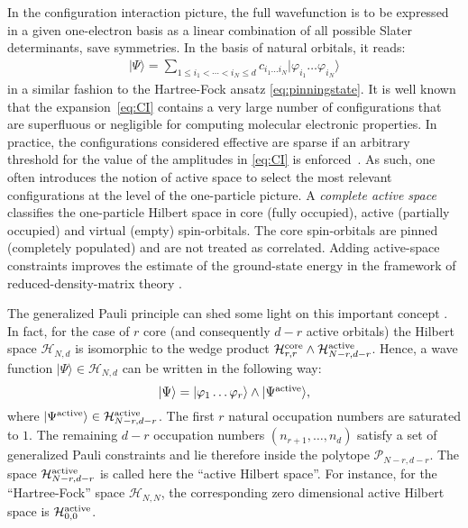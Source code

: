 \documentclass[aps,twocolumn,showpacs,pra,superscriptaddress,floatfix,longbibliography]{revtex4-1}
\newcommand{\7}{\dagger}
\newcommand{\ket}[1]{\mbox{$| #1 \rangle$}}
\renewcommand{\H}{\mathcal{H}}
\begin{document}
 In the configuration interaction picture, the full wavefunction
is to be expressed in a given one-electron basis as a linear 
combination of all possible Slater determinants, save symmetries. 
In the basis of natural orbitals, it reads:
\begin{align}
  \label{eq:CI}
  \ket{\Psi} = \sum_{1\leq i_1< \cdots < i_N \leq d} c_{i_1\ldots i_N}  \ket{\varphi_{i_1}\ldots\varphi_{i_N}}
\end{align}
in a similar fashion to the Hartree-Fock ansatz
\eqref{eq:pinningstate}.  It is well known that the 
expansion~\eqref{eq:CI} contains a very large 
number of configurations that are superfluous or 
negligible for computing molecular electronic properties. 
In practice, the configurations considered effective 
are sparse if an arbitrary threshold for the value of the 
amplitudes in \eqref{eq:CI} is enforced~\cite{Mentel2014}. 
As such, one often introduces the notion
of active space to select the most relevant configurations at the
level of the one-particle picture. A \textit{complete active space}
classifies the one-particle Hilbert space in core (fully occupied), active
(partially occupied) and virtual (empty) spin-orbitals.
The core spin-orbitals are pinned (completely populated) 
and are not treated as correlated. 
Adding active-space constraints
 improves the estimate of the 
ground-state energy in the framework of reduced-density-matrix
theory \cite{acrdm}.

The generalized Pauli principle can shed some light on this 
important concept \cite{TVS17,SBV}. In fact, 
for the case of $r$ core (and consequently $d-r$ active orbitals) 
the Hilbert space $\H_{N,d}$ is isomorphic to the wedge product 
$\H^{\rm core}_{r,r} \wedge \H^{\rm active}_{N-r,d-r}$.
Hence, a wave function 
 $\ket{\Psi} \in   \H_{N,d}$ can be written in the following way:
 \begin{equation}
 \ket{\Psi} = \ket{\varphi_1\dots\varphi_r}  \wedge \ket{\Psi^{\rm active}},
 \end{equation}
 where $\ket{\Psi^{\rm active}} \in \H^{\rm active}_{N-r,d-r}$. 
The first $r$ natural occupation numbers 
are saturated to $1$. The remaining $d-r$ occupation numbers 
$(n_{r +1}, \dots, n_d)$
satisfy a set of generalized Pauli constraints
and lie therefore inside the polytope $\mathcal{P}_{N-r,d-r}$. 
The space $\H^{\rm active}_{N-r,d-r}$ is called here the 
``active Hilbert space''. 
For instance, for the ``Hartree-Fock'' space
$\H_{N,N}$, the corresponding zero dimensional active 
Hilbert space is $\H^{\rm active}_{0,0}$.
\end{document}
